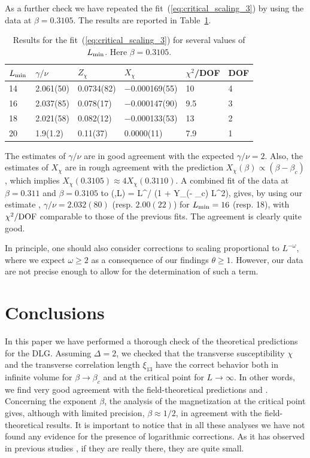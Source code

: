 \documentclass[12pt]{article}
\newcommand{\text}{\rm}
\begin{document}
As a further check we have repeated the fit~(\ref{eq:critical_scaling_3}) by 
using the data at $\beta=0.3105$. 
The results are reported in Table~\ref{results-fit-critical-scaling-3}.
%
\begin{table}
\begin{center}
\begin{tabular}{|l|l|l|l|l|l|}
\hline
$L_{\rm min}$ & $\gamma/\nu$ & $Z_\chi$ &$X_\chi$ & $\chi^2$/DOF & DOF \\
\hline
14 & 2.061(50)  & 0.0734(82)  & $-$0.000169(55) & 10  & 4  \\
16 & 2.037(85)  & 0.078(17)    & $-$0.000147(90)   & 9.5  &3   \\
18 & 2.021(58) & 0.082(12)    & $-$0.000133(53)  & 13  & 2  \\
20 & 1.9(1.2)  &  0.11(37)   & 0.0000(11)  & 7.9  &  1 \\
\hline
\end{tabular}
\end{center}
\caption{Results for the fit~(\ref{eq:critical_scaling_3})
for several values of $L_{\rm min}$.  Here $\beta = 0.3105$.
}
\label{results-fit-critical-scaling-3}
\end{table}  
%
The estimates of $\gamma/\nu$ are in good agreement with the 
expected $\gamma/\nu= 2$. Also, the estimates of $X_\chi$ are 
in rough agreement with the prediction $X_\chi(\beta) \propto (\beta-\beta_c)$,
which implies $X_\chi(0.3105)\approx 4 X_\chi(0.3110)$. 
A combined fit of the data at $\beta=0.311$ and $\beta = 0.3105$ to
\be
\chi(\beta,L) = L^{\gamma/\nu} (1 + Y_\chi (\beta - \beta_c) L^2),
\ee
gives, by using our estimate , 
$\gamma/\nu = 2.032(80)$ (resp. $2.00(22)$) for $L_{\rm min} = 16$
(resp. 18),
with $\chi^2/\text{DOF}$ comparable to those of the previous fits. 
The agreement is clearly quite good.

In principle, one should also consider corrections to scaling proportional 
to $L^{-\omega}$,
where we expect $\omega\ge 2$ as a consequence of our 
findings $\theta\ge 1$. However, our data are not precise enough 
to allow for the determination of such a term.

\section{Conclusions}
\label{sec:conclusions}

In this paper we have performed a thorough check of the theoretical predictions
for the DLG. Assuming $\Delta = 2$, we checked that the transverse 
susceptibility $\chi$ and the transverse correlation length $\xi_{13}$
have the correct behavior both in infinite volume for $\beta\to\beta_c$
and at the critical point for $L\to\infty$. In other words, 
we find very good agreement with the field-theoretical predictions 
 and . Concerning the exponent $\beta$, 
the analysis of the 
magnetization at the critical point gives,
although with limited precision,
$\beta\approx 1/2$, in agreement
with the field-theoretical results. It is important to notice that 
in all these analyses we have not found any evidence for the presence
of logarithmic corrections. As it has observed in previous studies
\cite{Leung92}, if they are really there, they are quite small.
\end{document}
